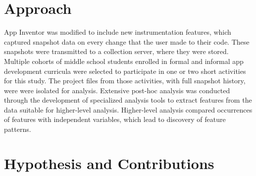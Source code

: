 \section{Approach}
App Inventor was modified to include new instrumentation features, which captured snapshot data on every change that the user made to their code. These snapshots were transmitted to a collection server, where they were stored. Multiple cohorts of middle school students enrolled in formal and informal app development curricula were selected to participate in one or two short activities for this study. The project files from those activities, with full snapshot history, were were isolated for analysis. Extensive post-hoc analysis was conducted through the development of specialized analysis tools to extract features from the data suitable for higher-level analysis. Higher-level analysis compared occurrences of features with independent variables, which lead to discovery of feature patterns.

\section{Hypothesis and Contributions}

